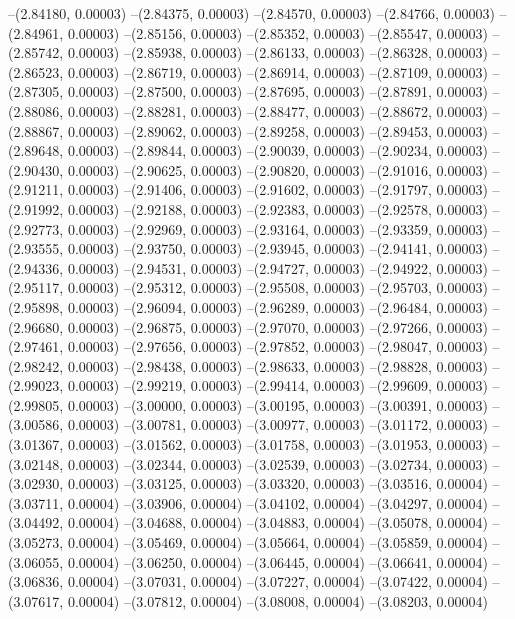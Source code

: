 --(2.84180, 0.00003)
--(2.84375, 0.00003)
--(2.84570, 0.00003)
--(2.84766, 0.00003)
--(2.84961, 0.00003)
--(2.85156, 0.00003)
--(2.85352, 0.00003)
--(2.85547, 0.00003)
--(2.85742, 0.00003)
--(2.85938, 0.00003)
--(2.86133, 0.00003)
--(2.86328, 0.00003)
--(2.86523, 0.00003)
--(2.86719, 0.00003)
--(2.86914, 0.00003)
--(2.87109, 0.00003)
--(2.87305, 0.00003)
--(2.87500, 0.00003)
--(2.87695, 0.00003)
--(2.87891, 0.00003)
--(2.88086, 0.00003)
--(2.88281, 0.00003)
--(2.88477, 0.00003)
--(2.88672, 0.00003)
--(2.88867, 0.00003)
--(2.89062, 0.00003)
--(2.89258, 0.00003)
--(2.89453, 0.00003)
--(2.89648, 0.00003)
--(2.89844, 0.00003)
--(2.90039, 0.00003)
--(2.90234, 0.00003)
--(2.90430, 0.00003)
--(2.90625, 0.00003)
--(2.90820, 0.00003)
--(2.91016, 0.00003)
--(2.91211, 0.00003)
--(2.91406, 0.00003)
--(2.91602, 0.00003)
--(2.91797, 0.00003)
--(2.91992, 0.00003)
--(2.92188, 0.00003)
--(2.92383, 0.00003)
--(2.92578, 0.00003)
--(2.92773, 0.00003)
--(2.92969, 0.00003)
--(2.93164, 0.00003)
--(2.93359, 0.00003)
--(2.93555, 0.00003)
--(2.93750, 0.00003)
--(2.93945, 0.00003)
--(2.94141, 0.00003)
--(2.94336, 0.00003)
--(2.94531, 0.00003)
--(2.94727, 0.00003)
--(2.94922, 0.00003)
--(2.95117, 0.00003)
--(2.95312, 0.00003)
--(2.95508, 0.00003)
--(2.95703, 0.00003)
--(2.95898, 0.00003)
--(2.96094, 0.00003)
--(2.96289, 0.00003)
--(2.96484, 0.00003)
--(2.96680, 0.00003)
--(2.96875, 0.00003)
--(2.97070, 0.00003)
--(2.97266, 0.00003)
--(2.97461, 0.00003)
--(2.97656, 0.00003)
--(2.97852, 0.00003)
--(2.98047, 0.00003)
--(2.98242, 0.00003)
--(2.98438, 0.00003)
--(2.98633, 0.00003)
--(2.98828, 0.00003)
--(2.99023, 0.00003)
--(2.99219, 0.00003)
--(2.99414, 0.00003)
--(2.99609, 0.00003)
--(2.99805, 0.00003)
--(3.00000, 0.00003)
--(3.00195, 0.00003)
--(3.00391, 0.00003)
--(3.00586, 0.00003)
--(3.00781, 0.00003)
--(3.00977, 0.00003)
--(3.01172, 0.00003)
--(3.01367, 0.00003)
--(3.01562, 0.00003)
--(3.01758, 0.00003)
--(3.01953, 0.00003)
--(3.02148, 0.00003)
--(3.02344, 0.00003)
--(3.02539, 0.00003)
--(3.02734, 0.00003)
--(3.02930, 0.00003)
--(3.03125, 0.00003)
--(3.03320, 0.00003)
--(3.03516, 0.00004)
--(3.03711, 0.00004)
--(3.03906, 0.00004)
--(3.04102, 0.00004)
--(3.04297, 0.00004)
--(3.04492, 0.00004)
--(3.04688, 0.00004)
--(3.04883, 0.00004)
--(3.05078, 0.00004)
--(3.05273, 0.00004)
--(3.05469, 0.00004)
--(3.05664, 0.00004)
--(3.05859, 0.00004)
--(3.06055, 0.00004)
--(3.06250, 0.00004)
--(3.06445, 0.00004)
--(3.06641, 0.00004)
--(3.06836, 0.00004)
--(3.07031, 0.00004)
--(3.07227, 0.00004)
--(3.07422, 0.00004)
--(3.07617, 0.00004)
--(3.07812, 0.00004)
--(3.08008, 0.00004)
--(3.08203, 0.00004)
